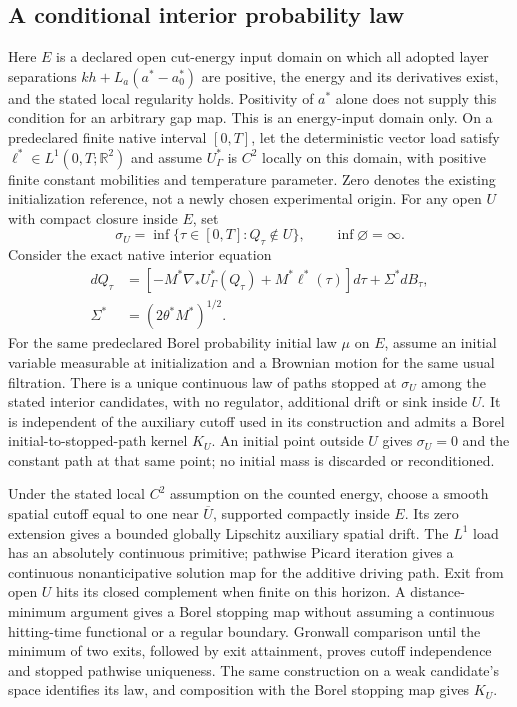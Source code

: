 \documentclass[11pt]{article}
\begin{document}
\subsection{A conditional interior probability law}
Here $E$ is a declared open cut-energy input domain on which all adopted
layer separations $kh+L_a(a^*-a_0^*)$ are positive, the energy and its
derivatives exist, and the stated local regularity holds. Positivity of
$a^*$ alone does not supply this condition for an arbitrary gap map.
This is an energy-input domain only. On a predeclared finite native interval $[0,T]$,
let the deterministic vector load satisfy $\ell^*\in L^1(0,T;\mathbb R^2)$
and assume $U_\Gamma^*$ is $C^2$ locally on this domain, with
positive finite constant mobilities and temperature parameter.
Zero denotes the existing initialization reference, not a newly chosen
experimental origin. For any open $U$ with compact closure inside $E$, set
\begin{equation}
 \sigma_U=\inf\{\tau\in[0,T]:Q_\tau\notin U\},\qquad
 \inf\varnothing=\infty .
\end{equation}
Consider the exact native interior equation
\begin{equation}
\begin{aligned}
 dQ_\tau&=\left[-M^*\nabla_*U_\Gamma^*(Q_\tau)
       +M^*\ell^*(\tau)\right]d\tau+\Sigma^*dB_\tau,\\
 \Sigma^*&=(2\theta^*M^*)^{1/2}.
\end{aligned}
\end{equation}
For the same predeclared Borel probability initial law $\mu$ on $E$,
assume an initial variable measurable at initialization and a Brownian
motion for the same usual filtration. There is a unique continuous law
of paths stopped at $\sigma_U$ among the stated interior candidates,
with no regulator, additional drift or sink inside $U$.
It is independent of the auxiliary cutoff used in its construction and
admits a Borel initial-to-stopped-path kernel $K_U$.
An initial point outside $U$ gives $\sigma_U=0$ and the constant path at
that same point; no initial mass is discarded or reconditioned.

Under the stated local $C^2$ assumption on the counted energy, choose a smooth
spatial cutoff equal to one near $\overline U$, supported compactly inside
$E$. Its zero extension gives a bounded globally Lipschitz auxiliary
spatial drift. The $L^1$ load has an absolutely continuous primitive;
pathwise Picard iteration gives a continuous nonanticipative solution map
for the additive driving path. Exit from open $U$ hits its closed
complement when finite on this horizon. A distance-minimum argument gives
a Borel stopping map without assuming a continuous hitting-time functional
or a regular boundary. Gronwall comparison until the minimum of two exits,
followed by exit attainment, proves cutoff independence and stopped
pathwise uniqueness. The same construction on a weak candidate's space
identifies its law, and composition with the Borel stopping map gives $K_U$.
\end{document}
